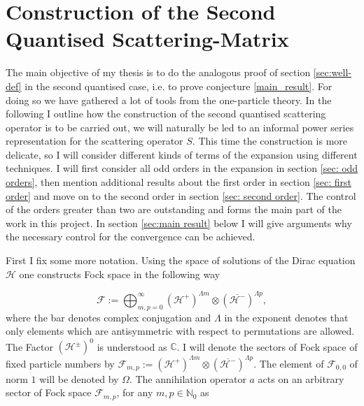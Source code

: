 \documentclass[b5paper,draft,openbib,12pt]{memoir}
\begin{document}
\section{Construction of the Second Quantised Scattering-Matrix}\label{sec:second quant}
The main objective of my thesis is to do the analogous proof of section
\ref{sec:well-def} in the second quantised case, %
i.e. to prove conjecture
\ref{main_result}. For doing so we have gathered a lot of tools from the
one-particle theory. In the following I outline how the construction of the
second quantised scattering operator is to be carried out, we will naturally be
led to an informal power series representation for the scattering operator \(S\). This time the construction is more delicate, so I will consider different kinds of terms of the expansion using different techniques. 
I will first consider all odd orders in the expansion in section \ref{sec: odd orders}, 
then mention additional results about the first order in section \ref{sec:
first order} and move on to the second order in section \ref{sec: second
order}. The control of the orders greater than two are outstanding and forms the main
part of the work in this project. In section \ref{sec:main result} below I
will give arguments why the necessary control for the convergence can be
achieved.

First I fix some more notation. Using the space of solutions of the Dirac equation \(\mathcal{H}\)
one constructs Fock space in the following way

\begin{equation}
\mathcal{F}:=\bigoplus_{m,p=0}^\infty \left(\mathcal{H}^+ \right)^{\Lambda m} \otimes \left(\overline{\mathcal{H}^- }\right)^{\Lambda p},
\end{equation}
where the bar denotes complex conjugation and \(\Lambda\) in the exponent
denotes that only elements which are antisymmetric with respect to permutations
are allowed. The Factor \(\left(\mathcal{H}^{\pm}\right)^0\) is understood as
\(\mathbb{C}\). I will denote the sectors of Fock space of fixed particle
numbers by \(\mathcal{F}_{m,p}:= \left(\mathcal{H}^+ \right)^{\Lambda m}
\otimes \left(\overline{\mathcal{H}^-} \right)^{\Lambda p}\). The element of
\(\mathcal{F}_{0,0}\) of norm \(1\) will be denoted by \(\Omega\).  The
annihilation operator \(a\) acts on an arbitrary sector of Fock space
\(\mathcal{F}_{m,p}\), for any \(m,p\in\mathbb{N}_0\) as
\end{document}
